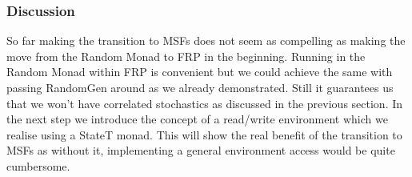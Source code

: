 \subsubsection{Discussion}
So far making the transition to MSFs does not seem as compelling as making the move from the Random Monad to FRP in the beginning. Running in the Random Monad within FRP is convenient but we could achieve the same with passing RandomGen around as we already demonstrated. Still it guarantees us that we won't have correlated stochastics as discussed in the previous section. In the next step we introduce the concept of a read/write environment which we realise using a StateT monad. This will show the real benefit of the transition to MSFs as without it, implementing a general environment access would be quite cumbersome.